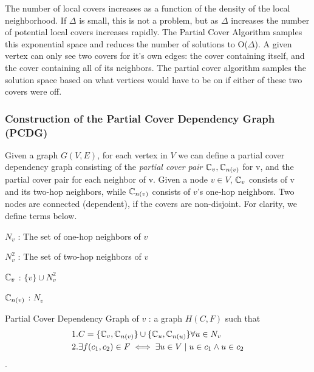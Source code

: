 \label{sec:PCDG}
The number of local covers increases as a function of the density of the local neighborhood. If $\Delta$ is small, this is not a problem, but as $\Delta$ increases the number of potential local covers increases rapidly. The Partial Cover Algorithm samples this exponential space and reduces the number of solutions to O($\Delta$). A given vertex can only see two covers for it's own edges: the cover containing itself, and the cover containing all of its neighbors. The partial cover algorithm samples the solution space based on what vertices would have to be on if either of these two covers were off. 

\subsubsection{Construction of the  Partial Cover Dependency Graph (PCDG)}

Given a graph $G(V,E)$, for each vertex in $V$ we can define a partial cover dependency graph consisting of the {\em partial cover pair} ${\mathbb C}_v, {\mathbb C}_{n(v)}$ for v, and the partial cover pair for each neighbor of v. Given a node $v \in V$, ${\mathbb C}_v$ consists of v and its two-hop neighbors, while ${\mathbb C}_{n(v)}$ consists of $v$'s one-hop neighbors. Two nodes are connected (dependent), if the covers are non-disjoint. For clarity, we define terms below.

\begin{defn}
$N_v$ : The set of one-hop neighbors of $v$
\end{defn}
\begin{defn}
$N_v^2$ : The set of two-hop neighbors of $v$ 
\end{defn}

\begin{defn}
${\mathbb C}_v$ : $\{v\} \cup N_v^2$
\end{defn}

\begin{defn}
${\mathbb C}_{n(v)}$ : $N_v$
\end{defn} 

\begin{defn}
Partial Cover Dependency Graph of $v$ : a graph $H(C,F)$ such that \begin{align*}& 1. C = \{{\mathbb C}_v, {\mathbb C}_{n(v)}\} \cup \{{\mathbb C}_u, {\mathbb C}_{n(u)}\} \forall u \in N_v\\ & 2. \exists f(c_1, c_2) \in F \iff \exists u \in V \mid u \in c_1 \land u \in c_2\end{align*}.
\end{defn} 

